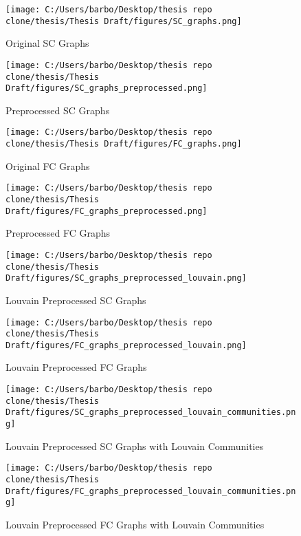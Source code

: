 \begin{figure}[h!]
\centering
\texttt{[image: C:/Users/barbo/Desktop/thesis repo clone/thesis/Thesis Draft/figures/SC\_graphs.png]}
\caption{Original SC Graphs}
\end{figure}

\begin{figure}[h!]
\centering
\texttt{[image: C:/Users/barbo/Desktop/thesis repo clone/thesis/Thesis Draft/figures/SC\_graphs\_preprocessed.png]}
\caption{Preprocessed SC Graphs}
\end{figure}

\begin{figure}[h!]
\centering
\texttt{[image: C:/Users/barbo/Desktop/thesis repo clone/thesis/Thesis Draft/figures/FC\_graphs.png]}
\caption{Original FC Graphs}
\end{figure}

\begin{figure}[h!]
\centering
\texttt{[image: C:/Users/barbo/Desktop/thesis repo clone/thesis/Thesis Draft/figures/FC\_graphs\_preprocessed.png]}
\caption{Preprocessed FC Graphs}
\end{figure}

\begin{figure}[h!]
\centering
\texttt{[image: C:/Users/barbo/Desktop/thesis repo clone/thesis/Thesis Draft/figures/SC\_graphs\_preprocessed\_louvain.png]}
\caption{Louvain Preprocessed SC Graphs}
\end{figure}

\begin{figure}[h!]
\centering
\texttt{[image: C:/Users/barbo/Desktop/thesis repo clone/thesis/Thesis Draft/figures/FC\_graphs\_preprocessed\_louvain.png]}
\caption{Louvain Preprocessed FC Graphs}
\end{figure}

\begin{figure}[h!]
\centering
\texttt{[image: C:/Users/barbo/Desktop/thesis repo clone/thesis/Thesis Draft/figures/SC\_graphs\_preprocessed\_louvain\_communities.png]}
\caption{Louvain Preprocessed SC Graphs with Louvain Communities}
\end{figure}

\begin{figure}[h!]
\centering
\texttt{[image: C:/Users/barbo/Desktop/thesis repo clone/thesis/Thesis Draft/figures/FC\_graphs\_preprocessed\_louvain\_communities.png]}
\caption{Louvain Preprocessed FC Graphs with Louvain Communities}
\end{figure}

